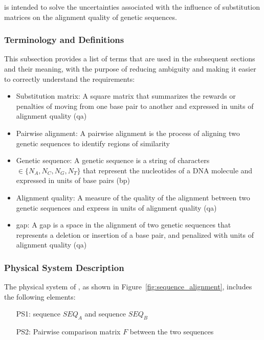 \documentclass[12pt]{article}
\begin{document}
\progname{} is intended to solve the uncertainties associated with the influence of 
substitution matrices on the alignment quality of genetic sequences.

\subsubsection{Terminology and  Definitions}



This subsection provides a list of terms that are used in the subsequent
sections and their meaning, with the purpose of reducing ambiguity and making it
easier to correctly understand the requirements:

\begin{itemize}

\item Substitution matrix: A square matrix that summarizes 
the rewards or penalties of moving from one base pair to another and 
expressed in units of alignment quality (qa)
\item Pairwise alignment: A pairwise alignment is the process of aligning two genetic 
sequences to identify regions of similarity 
\item Genetic sequence: A genetic sequence is a string of characters $\in \{N_A, N_C, N_G, N_T\}$ that represent 
the nucleotides of a DNA molecule and expressed in units of base pairs (bp)
\item Alignment quality: A measure of the quality of the alignment between two genetic 
sequences and express in units of alignment quality (qa)
\item gap: A gap is a space in the alignment of two genetic sequences that represents
a deletion or insertion of a base pair, and penalized with units of alignment quality (qa)

\end{itemize}

\subsubsection{Physical System Description} \label{sec_phySystDescrip}


The physical system of \progname{}, as shown in Figure~\ref{fig:sequence_alignment},
includes the following elements:

\begin{itemize}

\item[PS1:] sequence $SEQ_A$ and sequence $SEQ_B$

\item[PS2:] Pairwise comparison matrix $F$ between the two sequences

\end{itemize}
\end{document}
